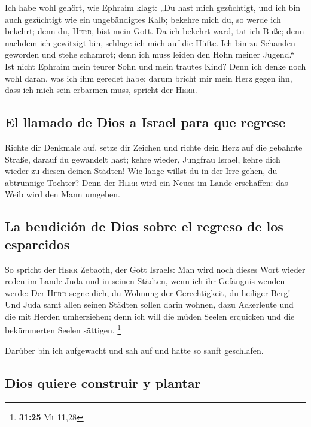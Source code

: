  Ich habe wohl gehört, wie Ephraim klagt: „Du hast mich
gezüchtigt, und ich bin auch gezüchtigt wie ein ungebändigtes Kalb;
bekehre mich du, so werde ich bekehrt; denn du, \textsc{Herr}, bist mein
Gott.  Da ich bekehrt ward, tat ich Buße; denn nachdem
ich gewitzigt bin, schlage ich mich auf die Hüfte. Ich bin zu Schanden
geworden und stehe schamrot; denn ich muss leiden den Hohn meiner
Jugend.``  Ist nicht Ephraim mein teurer Sohn und mein
trautes Kind? Denn ich denke noch wohl daran, was ich ihm geredet habe;
darum bricht mir mein Herz gegen ihn, dass ich mich sein erbarmen muss,
spricht der \textsc{Herr}.

\hypertarget{el-llamado-de-dios-a-israel-para-que-regrese}{%
\subsection{El llamado de Dios a Israel para que
regrese}\label{el-llamado-de-dios-a-israel-para-que-regrese}}

 Richte dir Denkmale auf, setze dir Zeichen und richte
dein Herz auf die gebahnte Straße, darauf du gewandelt hast; kehre
wieder, Jungfrau Israel, kehre dich wieder zu diesen deinen Städten!
 Wie lange willst du in der Irre gehen, du abtrünnige
Tochter? Denn der \textsc{Herr} wird ein Neues im Lande erschaffen: das
Weib wird den Mann umgeben.

\hypertarget{la-bendiciuxf3n-de-dios-sobre-el-regreso-de-los-esparcidos}{%
\subsection{La bendición de Dios sobre el regreso de los
esparcidos}\label{la-bendiciuxf3n-de-dios-sobre-el-regreso-de-los-esparcidos}}

 So spricht der \textsc{Herr} Zebaoth, der Gott Israels:
Man wird noch dieses Wort wieder reden im Lande Juda und in seinen
Städten, wenn ich ihr Gefängnis wenden werde: Der \textsc{Herr} segne
dich, du Wohnung der Gerechtigkeit, du heiliger Berg! 
Und Juda samt allen seinen Städten sollen darin wohnen, dazu Ackerleute
und die mit Herden umherziehen;  denn ich will die müden
Seelen erquicken und die bekümmerten Seelen sättigen. \footnote{\textbf{31:25}
  Mt 11,28}

 Darüber bin ich aufgewacht und sah auf und hatte so
sanft geschlafen.

\hypertarget{dios-quiere-construir-y-plantar}{%
\subsection{Dios quiere construir y
plantar}\label{dios-quiere-construir-y-plantar}}

